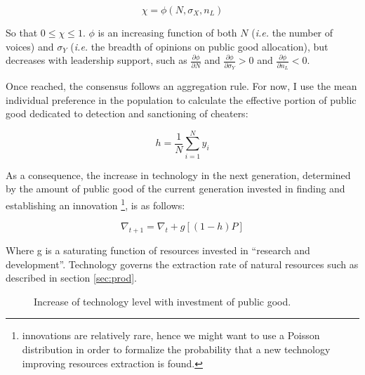 \documentclass[a4paper]{article}
\begin{document}
\begin{equation}
\chi = \phi\left(N,\sigma_X,n_L\right)
\end{equation}  

So that $0\le\chi\le1$. $\phi$ is an increasing function of both $N$ (\textit{i.e.} the number of voices) and $\sigma_Y$ (\textit{i.e.} the breadth of opinions on public good allocation), but decreases with leadership support, such as $\frac{\partial\phi}{\partial N}$ and $\frac{\partial\phi}{\partial\sigma_Y}>0$ and $\frac{\partial\phi}{\partial n_L}<0$.

Once reached, the consensus follows an aggregation rule. For now, I use the mean individual preference in the population to calculate the effective portion of public good dedicated to detection and sanctioning of cheaters:

\begin{equation}
h=\frac{1}{N} \sum_{i=1}^{N}y_i
\end{equation}

As a consequence, the increase in technology in the next generation, determined by the amount of public good of the current generation invested in finding and establishing an innovation \footnote{innovations are relatively rare, hence we might want to use a Poisson distribution in order to formalize the probability that a new technology improving resources extraction is found.}, is as follows:

\begin{equation}
\nabla_{t+1}=\nabla_t + g\left[\left(1-h\right)P\right]
\end{equation}

Where g is a saturating function of resources invested in ``research and development''. Technology governs the extraction rate of natural resources such as described in section \ref{sec:prod}.

\begin{figure}[!htbp]
	\begin{center}
	\end{center}
	\caption{Increase of technology level with investment of public good.}
	\label{fig:techfunc}
\end{figure} 
\end{document}
